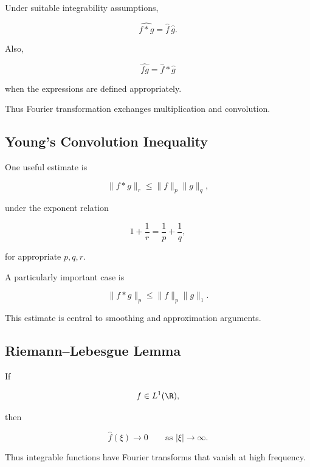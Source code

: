 \begin{theorem}
Under suitable integrability assumptions,

\[
\boxed{
\widehat{f*g}
=
\widehat{f}\,\widehat{g}.
}
\]
\end{theorem}

Also,

\[
\boxed{
\widehat{fg}
=
\widehat{f}*\widehat{g}
}
\]

when the expressions are defined appropriately.

Thus Fourier transformation exchanges multiplication and convolution.

\subsection{Young's Convolution Inequality}
\label{subsec:young-convolution}

One useful estimate is

\[
\boxed{
\|f*g\|_r
\leq
\|f\|_p\|g\|_q,
}
\]

under the exponent relation

\[
\boxed{
1+\frac1r
=
\frac1p+\frac1q,
}
\]

for appropriate \(p,q,r\).

A particularly important case is

\[
\boxed{
\|f*g\|_p
\leq
\|f\|_p\|g\|_1.
}
\]

This estimate is central to smoothing and approximation arguments.

\subsection{Riemann--Lebesgue Lemma}
\label{subsec:riemann-lebesgue}

\begin{theorem}
If

\[
f\in L^1(\R),
\]

then

\[
\boxed{
\widehat{f}(\xi)\to0
\qquad
\text{as }
|\xi|\to\infty.
}
\]
\end{theorem}

Thus integrable functions have Fourier transforms that vanish at high
frequency.

